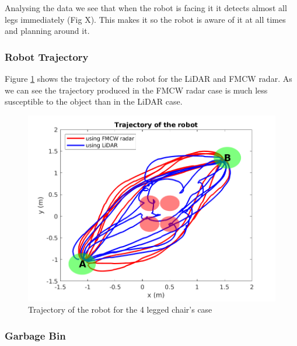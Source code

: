 Analysing the data we see that when the robot is facing it it detects almost all legs immediately 
(Fig X). This makes it so the robot is aware of it at all times and planning around it.


\subsubsection*{Robot Trajectory}

Figure \ref{fig:traj2} shows the trajectory of the robot for the \ac{LiDAR} and \ac{FMCW} \ac{radar}. As we can see the trajectory  produced in the \ac{FMCW} radar case is much less susceptible to the object than in the \ac{LiDAR} case. 
\begin{figure}[ht!]
\centerline{\includegraphics [width=0.7 \textwidth]{imgs/chapter5/traj2.png}}
\caption{Trajectory of the robot for the 4 legged chair's case}
\label{fig:traj2}
\end{figure}

\subsubsection{Garbage Bin}

